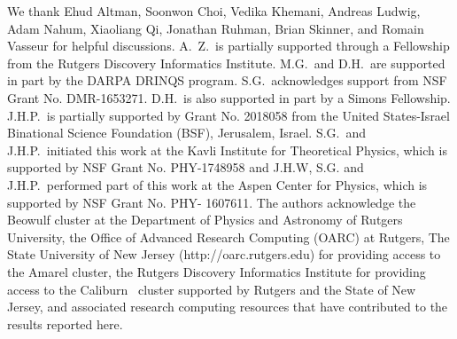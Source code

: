 \documentclass[prl,twocolumn,aps,showpacs,amsmath,amssymb,superscriptaddress,floatfix,longbibliography]{revtex4-1}
\begin{document}
\begin{acknowledgments}
We thank Ehud Altman, Soonwon Choi, Vedika Khemani, Andreas Ludwig, Adam Nahum, Xiaoliang Qi, Jonathan Ruhman, Brian Skinner, and Romain Vasseur for helpful discussions. A.\ Z.\ is partially supported through a Fellowship from the Rutgers Discovery Informatics Institute. M.G.\ and D.H.\ are supported in part by the DARPA DRINQS program.  S.G.\ acknowledges support from NSF Grant No. DMR-1653271.   D.H.\ is also supported in part by a Simons Fellowship. J.H.P.\ is partially supported by Grant No. 2018058 from the United States-Israel Binational Science Foundation (BSF), Jerusalem, Israel.
S.G.\ and J.H.P.\ initiated this work at the Kavli Institute for Theoretical Physics, which is supported by NSF Grant No. PHY-1748958 and
J.H.W, S.G. and J.H.P.\  performed part of this work at the Aspen Center for Physics, which is supported by NSF Grant No. PHY- 1607611.
The authors acknowledge the Beowulf cluster at the Department of Physics and Astronomy of Rutgers University, the Office of Advanced Research Computing (OARC) at Rutgers, The State University of New Jersey (http://oarc.rutgers.edu) for providing access to the Amarel cluster, the Rutgers Discovery Informatics Institute for providing access to the Caliburn~\cite{Caliburn} cluster supported by Rutgers and the State of New Jersey, and associated research computing resources that have contributed to the results reported here.
\end{acknowledgments}
\end{document}
